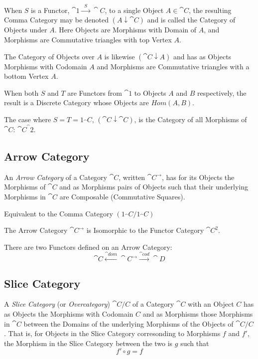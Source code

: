 When $S$ is a Functor, $\cat{1} \xrightarrow{\;\;S\;\;}
\cat{C}$, to a single Object $A \in \cat{C}$, the resulting
Comma Category may be denoted $(A \downarrow \cat{C})$ and is
called the Category of Objects under $A$. Here Objects are Morphisms
with Domain of $A$, and Morphisms are Commutative triangles with top
Vertex $A$.

The Category of Objects over $A$ is likewise $(\cat{C} \downarrow
A)$ and has as Objects Morphisms with Codomain $A$ and Morphisms are
Commutative triangles with a bottom Vertex $A$.

When both $S$ and $T$ are Functors from $\cat{1}$ to Objects $A$
and $B$ respectively, the result is a Discrete Category whose Objects
are $Hom(A,B)$.

The case where $S = T = 1_\cat{C}$, $(\cat{C} \downarrow
\cat{C})$, is the Category of all Morphisms of $\cat{C}$:
$\cat{C}^\cat{2}$.



\subsection{Arrow Category}\label{sec:arrow_category}

An \emph{Arrow Category} of a Category $\cat{C}$, written
$\cat{C^{\rightarrow}}$, has for its Objects the Morphisms of
$\cat{C}$ and as Morphisms pairs of Objects such that their
underlying Morphisms in $\cat{C}$ are Composable (Commutative
Squares).

Equivalent to the Comma Category $(1_\cat{C}/1_\cat{C})$

The Arrow Category $\cat{C}^\rightarrow$ is Isomorphic to the
Functor Category $\cat{C^2}$.

There are two Functors defined on an Arrow Category:
\[
  \cat{C} \xleftarrow{\cat{dom}} \cat{C}^\rightarrow
  \xrightarrow{\cat{cod}} \cat{D}
\]



\subsection{Slice Category}\label{sec:slice_category}

A \emph{Slice Category} (or \emph{Overcategory}) $\cat{C}/C$ of a
Category $\cat{C}$ with an Object $C$ has as Objects the Morphisms
with Codomain $C$ and as Morphisms those Morphisms in $\cat{C}$
between the Domains of the underlying Morphisms of the Objects of
$\cat{C}/C$. That is, for Objects in the Slice Category corresonding
to Morphisms $f$ and $f'$, the Morphism in the Slice Category between
the two is $g$ such that
\[
  f' \circ g = f
\]

